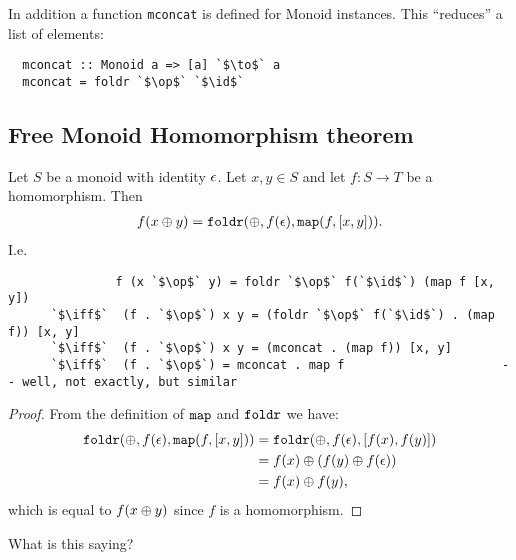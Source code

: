 \documentclass[12pt]{article}
\begin{document}
In addition a function {\tt mconcat} is defined for Monoid instances. This ``reduces'' a list of elements:
\begin{verbatim}
  mconcat :: Monoid a => [a] `$\to$` a
  mconcat = foldr `$\op$` `$\id$`
\end{verbatim}

\subsection{Free Monoid Homomorphism theorem}


\newpage
\begin{theorem*}
  Let $S$ be a monoid with identity $\epsilon$. Let $x, y \in S$ and let $f:S \to T$ be a
  homomorphism. Then
  \begin{align*}
    f(x \oplus y) = \text{{\tt foldr}}(\oplus, f(\epsilon), \text{{\tt map}}(f, [x, y])).
  \end{align*}
  I.e.
  \begin{normalfont}
    \begin{verbatim}
               f (x `$\op$` y) = foldr `$\op$` f(`$\id$`) (map f [x, y])
      `$\iff$`  (f . `$\op$`) x y = (foldr `$\op$` f(`$\id$`) . (map f)) [x, y]
      `$\iff$`  (f . `$\op$`) x y = (mconcat . (map f)) [x, y]
      `$\iff$`  (f . `$\op$`) = mconcat . map f                      -- well, not exactly, but similar
    \end{verbatim}
  \end{normalfont}
\end{theorem*}

\begin{proof}
  From the definition of $\text{{\tt map}}$ and $\text{{\tt foldr}}$ we have:
  \begin{align*}
    \text{{\tt foldr}}(\oplus, f(\epsilon), \text{{\tt map}}(f, [x, y]))
    &= \text{{\tt foldr}}(\oplus, f(\epsilon), [f(x), f(y)])\\
    &= f(x) \oplus (f(y) \oplus f(\epsilon))\\
    &= f(x) \oplus f(y),
  \end{align*}
  which is equal to $f(x \oplus y)$ since $f$ is a homomorphism.
\end{proof}

\begin{remark*}
  What is this saying?


\end{remark*}
\end{document}
